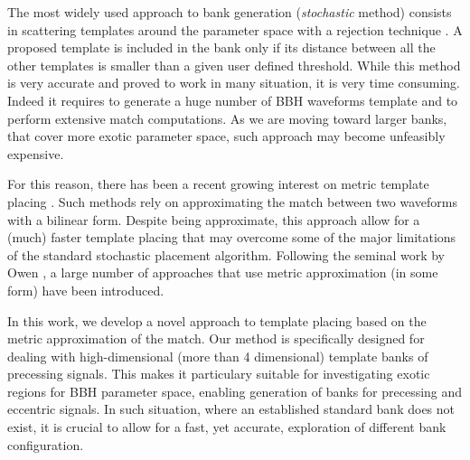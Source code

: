 \documentclass[twocolumn,showpacs,preprintnumbers,nofootinbib,prd,
superscriptaddress,10pt]{revtex4-2}
\begin{document}
The most widely used approach to bank generation ({\it stochastic} method) consists in scattering templates around the parameter space with a rejection technique \cite{sbank}. A proposed template is included in the bank only if its distance between all the other templates is smaller than a given user defined threshold. While this method is very accurate and proved to work in many situation, it is very time consuming. Indeed it requires to generate a huge number of BBH waveforms template and to perform extensive match computations.
As we are moving toward larger banks, that cover more exotic parameter space, such approach may become unfeasibly expensive.

For this reason, there has been a recent growing interest on metric template placing \cite{Roy:2017oul, 2018cosp...42E2899R, Coogan:2022qxs, other?}. Such methods rely on approximating the match between two waveforms with a bilinear form. Despite being approximate, this approach allow for a (much) faster template placing that may overcome some of the major limitations of the standard stochastic placement algorithm.
Following the seminal work by Owen \cite{owen_metric}, a large number of approaches that use metric approximation (in some form) have been introduced.

In this work, we develop a novel approach to template placing based on the metric approximation of the match.
Our method is specifically designed for dealing with high-dimensional (more than 4 dimensional) template banks of precessing signals. This makes it particulary suitable for investigating exotic regions for BBH parameter space, enabling generation of banks for precessing and eccentric signals. In such situation, where an established standard bank does not exist, it is crucial to allow for a fast, yet accurate, exploration of different bank configuration.
\end{document}
